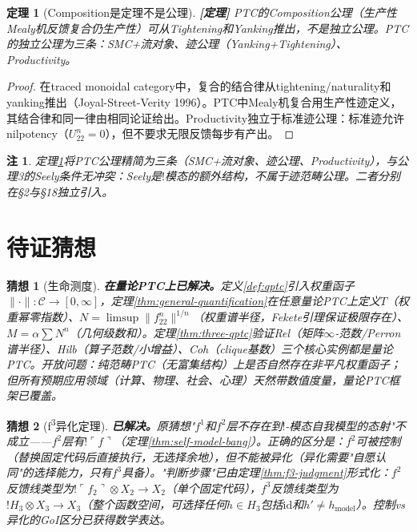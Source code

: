 \documentclass[11pt,a4paper]{article}
\newtheorem{theorem}{定理}
\newtheorem{conjecture}{猜想}
\newtheorem{remark}{注}
\newcommand{\lvl}[1]{\hfill\textbf{\footnotesize[#1]}}
\newcommand{\lvP}{\lvl{定理}}
\newcommand{\bang}{{!}}
\newcommand{\tensor}{\otimes}
\begin{document}
\begin{theorem}[Composition是定理不是公理]\label{thm:composition-derivable}\lvP
PTC的Composition公理（生产性Mealy机反馈复合仍生产性）可从Tightening和Yanking推出，不是独立公理。PTC的独立公理为三条：SMC+流对象、迹公理（Yanking+Tightening）、Productivity。
\end{theorem}

\begin{proof}
在traced monoidal category中，复合的结合律从tightening/naturality和yanking推出（Joyal-Street-Verity 1996）。PTC中Mealy机复合用生产性迹定义，其结合律和同一律由相同论证给出。Productivity独立于标准迹公理：标准迹允许nilpotency（$U_{22}^n=0$），但不要求无限反馈每步有产出。
\end{proof}

\begin{remark}
定理\ref{thm:composition-derivable}将PTC公理精简为三条（SMC+流对象、迹公理、Productivity），与公理3的Seely条件无冲突：Seely是$\bang$模态的额外结构，不属于迹范畴公理。二者分别在§2与§18独立引入。
\end{remark}

\section{待证猜想}

\begin{conjecture}[生命测度]\label{conj:measure}
\textbf{在量论PTC上已解决。}定义\ref{def:qptc}引入权重函子$\|\cdot\|:\mathcal{C}\to[0,\infty]$，定理\ref{thm:general-quantification}在任意量论PTC上定义$T$（权重幂零指数）、$N=\limsup\|f_{22}^n\|^{1/n}$（权重谱半径，Fekete引理保证极限存在）、$M=\alpha\sum N^n$（几何级数和）。定理\ref{thm:three-qptc}验证Rel（矩阵$\infty$-范数/Perron谱半径）、Hilb（算子范数/小增益）、Coh（clique基数）三个核心实例都是量论PTC。开放问题：纯范畴PTC（无富集结构）上是否自然存在非平凡权重函子；但所有预期应用领域（计算、物理、社会、心理）天然带数值度量，量论PTC框架已覆盖。
\end{conjecture}

\begin{conjecture}[f\textsuperscript{3}异化定理]\label{conj:f3}
\textbf{已解决。}原猜想"$f^1$和$f^2$层不存在到$\bang$-模态自我模型的态射"不成立——$f^2$层有$\bang\ulcorner f\urcorner$（定理\ref{thm:self-model-bang}）。正确的区分是：$f^2$可被\emph{控制}（替换固定代码后直接执行，无选择余地），但不能被\emph{异化}（异化需要"自愿认同"的选择能力，只有$f^3$具备）。"判断步骤"已由定理\ref{thm:f3-judgment}形式化：$f^2$反馈线类型为$\bang\ulcorner f_2\urcorner\tensor X_2\to X_2$（单个固定代码），$f^3$反馈线类型为$\bang H_3\tensor X_3\to X_3$（整个函数空间，可选择任何$h\in H_3$包括$\mathrm{id}$和$h'\neq h_{\text{model}}$）。控制vs异化的GoI区分已获得数学表达。
\end{conjecture}
\end{document}
